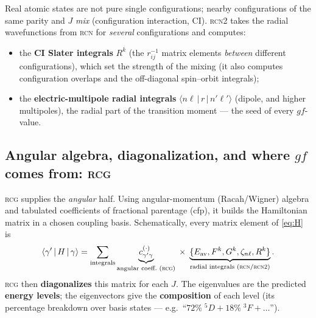 \documentclass[11pt]{article}
\newcommand{\Fk}{F^{k}}
\newcommand{\Gk}{G^{k}}
\newcommand{\Rk}{R^{k}}
\newcommand{\znl}{\zeta_{n\ell}}
\newcommand{\Eav}{E_{\mathrm{av}}}
\newcommand{\prog}[1]{\textsc{#1}}
\begin{document}
Real atomic states are not pure single configurations; nearby configurations of
the same parity and $J$ \emph{mix} (configuration interaction, CI). \prog{rcn2}
takes the radial wavefunctions from \prog{rcn} for \emph{several} configurations
and computes:
\begin{itemize}[nosep]
\item the \textbf{CI Slater integrals} $\Rk$ (the $r_{ij}^{-1}$ matrix elements
\emph{between} different configurations), which set the strength of the mixing
(it also computes configuration overlaps and the off-diagonal spin--orbit
integrals);
\item the \textbf{electric-multipole radial integrals}
$\langle n\ell \,|\, r \,|\, n'\ell'\rangle$ (dipole, and higher multipoles), the
radial part of the transition moment --- the seed of every $gf$-value.
\end{itemize}

\subsection{Angular algebra, diagonalization, and where $gf$ comes from: \prog{rcg}}
\label{sec:rcg}

\prog{rcg} supplies the \emph{angular} half. Using angular-momentum
(Racah/Wigner) algebra and tabulated coefficients of fractional parentage (cfp),
it builds the Hamiltonian matrix in a chosen coupling basis. Schematically,
every matrix element of \eqref{eq:H} is
\begin{equation}
\langle \gamma' \,|\, H \,|\, \gamma\rangle
= \sum_{\text{integrals}}
\underbrace{c_{\gamma'\gamma}^{(\cdot)}}_{\text{angular coeff.\ (\prog{rcg})}}
\;\times\;
\underbrace{\{\Eav,\Fk,\Gk,\znl,\Rk\}}_{\text{radial integrals (\prog{rcn}/\prog{rcn2})}} .
\label{eq:matrixelement}
\end{equation}
\prog{rcg} then \textbf{diagonalizes} this matrix for each $J$. The eigenvalues
are the predicted \textbf{energy levels}; the eigenvectors give the
\textbf{composition} of each level (its percentage breakdown over basis states
--- e.g.\ ``$72\%\;{}^5\!D + 18\%\;{}^3\!F + \dots$'').
\end{document}
